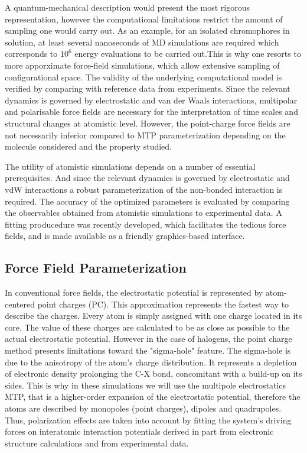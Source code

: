 \documentclass[journal=jacsat,manuscript=article]{achemso}
\begin{document}
\noindent
A quantum-mechanical description would present the most rigorous
representation, however the computational limitations restrict the
amount of sampling one would carry out. As an example, for an isolated
chromophores in solution, at least several nanoseconds of MD
simulations are required which corresponds to $10^6$ energy
evaluations to be carried out.This is why one resorts to more
apporximate force-field simulations, which allow extensive sampling of
configurational space. The validity of the underlying computational
model is verified by comparing with reference data from
experiments. Since the relevant dynamics is governed by electrostatic
and van der Waals interactions, multipolar and polarisable force
fields are necessary for the interpretation of time scales and
structural changes at atomistic level. However, the point-charge force
fields are not necessarily inferior compared to MTP parameterization
depending on the molecule considered and the property studied.

\noindent
The utility of atomistic simulations depends on a number of essential
prerequisites. And since the relevant dynamics is governed by
electrostatic and vdW interactions a robust parameterization of the
non-bonded interaction is required. The accuracy of the optimized
parameters is evaluated by comparing the observables obtained from
atomistic simulations to experimental data. A fitting producedure was
recently developed, which facilitates the tedious force fields, and is
made available as a friendly graphics-based interface.


\subsection{Force Field Parameterization}
In conventional force fields, the electrostatic potential is
represented by atom-centered point charges (PC). This approximation
represents the fastest way to describe the charges. Every atom is
simply assigned with one charge located in its core. The value of
these charges are calculated to be as close as possible to the actual
electrostatic potential. However in the case of halogens, the point
charge method presents limitations toward the "sigma-hole"
feature. The sigma-hole is due to the anisotropy of the atom's charge
distribution. It represents a depletion of electronic density
prolonging the C-X bond, concomitant with a build-up on its
sides. This is why in these simulations we will use the multipole
electrostatics MTP, that is a higher-order expansion of the
electrostatic potential, therefore the atoms are described by
monopoles (point charges), dipoles and quadrupoles. Thus, polarization
effects are taken into account by fitting the system's driving forces
on interatomic interaction potentials derived in part from electronic
structure calculations and from experimental data.
\end{document}
